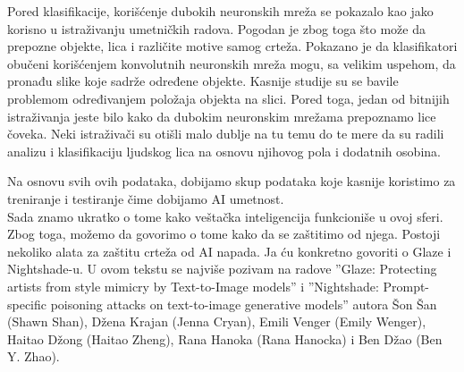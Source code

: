     Pored klasifikacije, korišćenje dubokih neuronskih mreža se pokazalo kao jako korisno u istraživanju umetničkih radova. Pogodan je zbog toga što može da prepozne objekte, lica i različite motive samog crteža. Pokazano je da klasifikatori obučeni korišćenjem konvolutnih neuronskih mreža mogu, sa velikim uspehom, da pronađu slike koje sadrže određene objekte. Kasnije studije su se bavile problemom određivanjem položaja objekta na slici. \cite{crowley2016art} Pored toga, jedan od bitnijih istraživanja jeste bilo kako da dubokim neuronskim mrežama prepoznamo lice čoveka. Neki istraživači su otišli malo dublje na tu temu do te mere da su radili analizu i klasifikaciju ljudskog lica na osnovu njihovog pola i dodatnih osobina. \cite{strezoski2018omniart}

    Na osnovu svih ovih podataka, dobijamo skup podataka koje kasnije koristimo za treniranje i testiranje čime dobijamo AI umetnost.\\

    Sada znamo ukratko o tome kako veštačka inteligencija funkcioniše u ovoj sferi. Zbog toga, možemo da govorimo o tome kako da se zaštitimo od njega. Postoji nekoliko alata za zaštitu crteža od AI napada. Ja ću konkretno govoriti o Glaze i Nightshade-u. U ovom tekstu se najviše pozivam na radove ''Glaze: Protecting artists from style mimicry by Text-to-Image models'' i ''Nightshade: Prompt-specific poisoning attacks on text-to-image generative models'' autora Šon Šan (Shawn Shan), Džena Krajan (Jenna Cryan), Emili Venger (Emily Wenger), Haitao Džong (Haitao Zheng), Rana Hanoka (Rana Hanocka) i Ben Džao (Ben Y. Zhao).